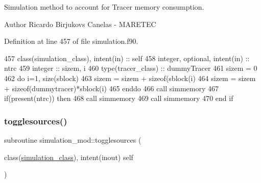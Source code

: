Simulation method to account for Tracer memory consumption. 

\begin{DoxyAuthor}{Author}
Ricardo Birjukovs Canelas -\/ M\+A\+R\+E\+T\+EC 
\end{DoxyAuthor}


Definition at line 457 of file simulation.\+f90.


\begin{DoxyCode}
457     \textcolor{keywordtype}{class}(simulation\_class), \textcolor{keywordtype}{intent(in)} :: self
458     \textcolor{keywordtype}{integer}, \textcolor{keywordtype}{optional}, \textcolor{keywordtype}{intent(in)} :: ntrc
459     \textcolor{keywordtype}{integer} :: sizem, i
460     \textcolor{keywordtype}{type}(tracer\_class) :: dummyTracer
461     sizem = 0
462     \textcolor{keywordflow}{do} i=1, \textcolor{keyword}{size}(sblock)
463         sizem = sizem + sizeof(sblock(i)%
464         sizem = sizem + sizeof(dummytracer)*sblock(i)%
465 \textcolor{keywordflow}{    enddo}
466     \textcolor{keyword}{call }simmemory%
467     \textcolor{keywordflow}{if}(\textcolor{keyword}{present}(ntrc)) \textcolor{keywordflow}{then}
468         \textcolor{keyword}{call }simmemory%
469         \textcolor{keyword}{call }simmemory%
470 \textcolor{keywordflow}{    end if}
\end{DoxyCode}
\mbox{\label{namespacesimulation__mod_a87a5141e4516b9610a6e4f0d2ff2d719}} 
\subsubsection{\texorpdfstring{togglesources()}{togglesources()}}
{\footnotesize\ttfamily subroutine simulation\+\_\+mod\+::togglesources (\begin{DoxyParamCaption}\item[{class(\mbox{\hyperlink{structsimulation__mod_1_1simulation__class}{simulation\+\_\+class}}), intent(inout)}]{self }\end{DoxyParamCaption})\hspace{0.3cm}{\ttfamily [private]}}



